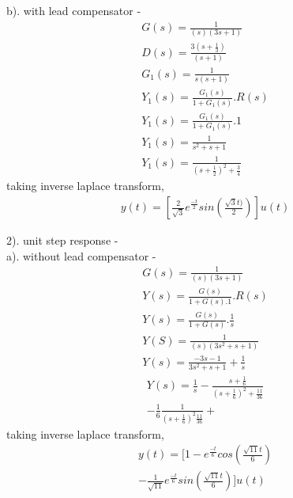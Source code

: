 \begin{enumerate}[label=\thesection.\arabic*.,ref=\thesection.\theenumi]
b). with lead compensator - 
\begin{align}
G(s) = \frac{1}{(s)(3s+1)}\\
D(s) = \frac{3(s+\frac{1}{3})}{(s+1)} \\
G_{1}(s) = \frac{1}{s(s+1)}\\
Y_{1}(s) = \frac{G_{1}(s)}{1+G_{1}(s)}.R(s)\\
Y_{1}(s) = \frac{G_{1}(s)}{1+G_{1}(s)}.1\\
Y_{1}(s) = \frac{1}{s^2+s+1}\\
Y_{1}(s) = \frac{1}{(s+\frac{1}{2})^2 + \frac{3}{4}} 
\end{align}
taking inverse laplace transform, 
\begin{align}
y(t) = [\frac{2}{\sqrt{3}}e^{\frac{-t}{2}}sin(\frac{\sqrt{3}t)}{2})]u(t)
\end{align}

2). unit step response - \\
a). without lead compensator - 
\begin{align}
G(s) = \frac{1}{(s)(3s+1)}\\
Y(s) = \frac{G(s)}{1+G(s).1}.R(s)\\
Y(s) = \frac{G(s)}{1+G(s)}.\frac{1}{s}\\
Y(S) = \frac{1}{(s)(3s^2+s+1)}\\
Y(s) = \frac{-3s-1}{3s^2+s+1} + \frac{1}{s}
\end{align}
\begin{equation}
\begin{split}
Y(s) = \frac{1}{s} - \frac{s+\frac{1}{6}}{(s+\frac{1}{6})^2 + \frac{11}{36}}\\ -\frac{1}{6}\frac{1}{(s+\frac{1}{6})^2  \frac{11}{36}}+
\end{split}
\end{equation}
taking inverse laplace transform, 
\begin{equation}
    \begin{split}
        y(t) = [1 - e^{\frac{-t}{6}}cos(\frac{\sqrt{11}t}{6})\\- \frac{1}{\sqrt{11}}e^{\frac{-t}{6}}sin(\frac{\sqrt{11}t}{6}) ]u(t)
    \end{split}
\end{equation}


\end{enumerate}
